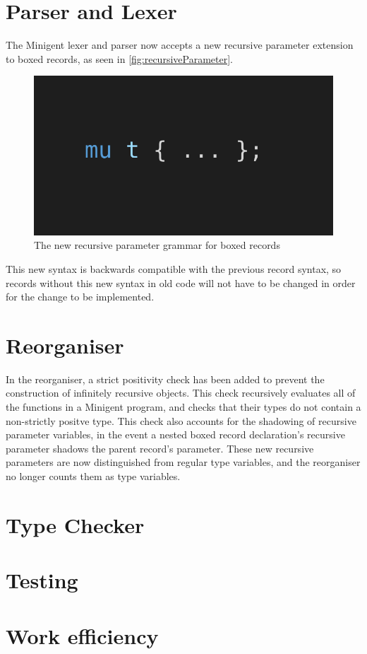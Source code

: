 \section{Parser and Lexer}

The Minigent lexer and parser now accepts a new recursive parameter extension to boxed records,
as seen in \autoref{fig:recursiveParameter}.

\begin{figure}
    \centering
    \includegraphics[width=0.5\linewidth]{content/recursive_parameter.png}
    \caption{The new recursive parameter grammar for boxed records}
    \label{fig:recursiveParameter}
\end{figure}

This new syntax is backwards compatible with the previous record syntax, so records without this new
syntax in old code will not have to be changed in order for the change to be implemented.


\section{Reorganiser}

In the reorganiser, a strict positivity check has been added to prevent the construction of infinitely
recursive objects. This check recursively evaluates all of the functions in a Minigent program, and
checks that their types do not contain a non-strictly positve type. This check also accounts for the
shadowing of recursive parameter variables, in the event a nested boxed record declaration's recursive
parameter shadows the parent record's parameter. These new recursive parameters are now distinguished from
regular type variables, and the reorganiser no longer counts them as type variables.


\section{Type Checker}


\section{Testing}


\section{Work efficiency}

